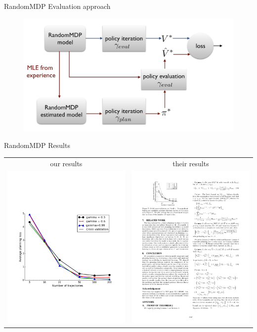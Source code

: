 \documentclass{beamer}
\begin{document}
\begin{frame}{RandomMDP Evaluation approach}
\begin{figure}
\includegraphics[page=1,width=1\textwidth]{RandomMDPEvaluation.png}
\end{figure}


\end{frame}

\begin{frame}{RandomMDP Results}
\begin{tabular}{cc}
our results & their results \\
	\includegraphics[page=1,height=.55\textheight,width=.5\textwidth]{../results/figure_2.pdf} &
	\includegraphics[page=1,width=.41\textwidth]{../results/originalCV.pdf}
\end{tabular}
\end{frame}
\end{document}
